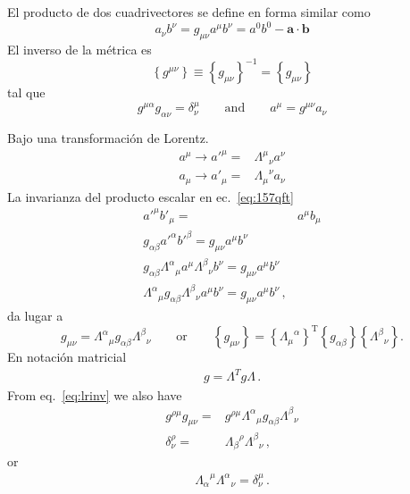 El producto de dos cuadrivectores se define en forma similar como
\begin{equation}
\label{eq:157qft}
  a_\nu b^\nu=g_{\mu\nu}a^\mu b^\nu=a^0b^0-\mathbf{a}\cdot\mathbf{b}
\end{equation}
El inverso de la métrica es
\begin{equation}
  \left\{ g^{\mu\nu} \right\}\equiv\left\{ g_{\mu\nu} \right\}^{-1}=\left\{ g_{\mu\nu} \right\}
\end{equation}
tal que
\begin{equation}
  g^{\mu\alpha}g_{\alpha\nu}=\delta^\mu_\nu\qquad\text{and}\qquad a^\mu=g^{\mu\nu}a_\nu
\end{equation}

Bajo una transformación de Lorentz.
\begin{align}
  a^\mu\to {a'}^\mu=&{\Lambda^\mu}_{\nu}a^\nu\\
  a_\mu\to {a'}_\mu=&{\Lambda_\mu}^{\nu}a_\nu\nonumber
\end{align}
La invarianza del producto escalar en ec.~\eqref{eq:157qft}
\begin{align}
  {a'}^\mu{b'}_\mu=&a^\mu b_\mu\nonumber\\
g_{\alpha\beta}{a'}^\alpha{b'}^\beta=g_{\mu\nu}a^\mu b^\nu\nonumber\\
g_{\alpha\beta}{\Lambda^\alpha}_\mu{a}^\mu{\Lambda^\beta}_\nu{b}^\nu=g_{\mu\nu}a^\mu b^\nu\nonumber\\
{\Lambda^\alpha}_\mu g_{\alpha\beta}{\Lambda^\beta}_\nu{a}^\mu{b}^\nu=g_{\mu\nu}a^\mu b^\nu\,,
\end{align}
da lugar a
\begin{equation}
  \label{eq:lrinv}
  g_{\mu\nu}={\Lambda^\alpha}_{\mu}g_{\alpha\beta}{\Lambda^\beta}_{\nu}\qquad\text{or}\qquad 
\left\{g_{\mu\nu}\right\}=\left\{{\Lambda_{\mu}}^{\alpha}\right\}^{\text{T}}\left\{g_{\alpha\beta}\right\}\left\{{\Lambda^\beta}_{\nu}\right\}.
\end{equation}
En notación matricial
\begin{align}
 g=\Lambda^T g \Lambda\,. 
\end{align}
From eq.~\eqref{eq:lrinv} we also have
\begin{align}
  g^{\rho\mu}g_{\mu\nu}=&g^{\rho\mu}{\Lambda^\alpha}_{\mu}g_{\alpha\beta}{\Lambda^\beta}_{\nu}\nonumber\\
  \delta^\rho_\nu=&{\Lambda_\beta}^\rho{\Lambda^\beta}_{\nu}\,,
\end{align}
or
\begin{align}
  {\Lambda_\alpha}^\mu{\Lambda^\alpha}_{\nu}=\delta^\mu_\nu\,.
\end{align}
